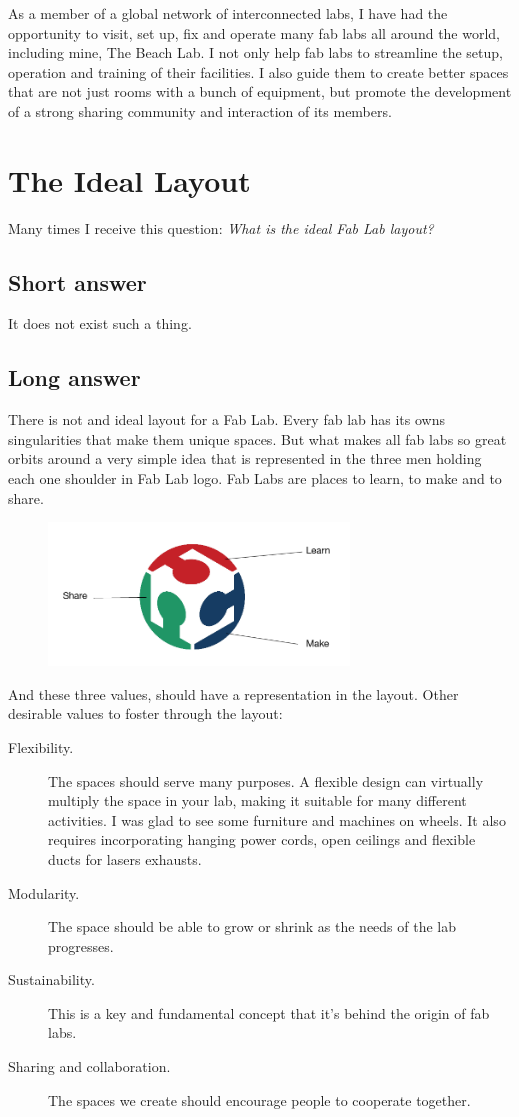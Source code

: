 \documentclass[a4paper,12pt,titlepage]{article}
\begin{document}
As a member of a global network of interconnected labs, I have had the opportunity to
visit, set up, fix and operate many fab labs all around the world, including mine, The Beach Lab. I not
only help fab labs to streamline the setup, operation and training of their facilities. I also
guide them to create better spaces that are not just rooms with a bunch of equipment, but
promote the development of a strong sharing community and interaction of its members.


\section{The Ideal Layout}
Many times I receive this question: \textit{What is the ideal Fab Lab layout?}
\subsection{Short answer} 
It does not exist such a thing.

\subsection{Long answer}
There is not and ideal layout for a Fab Lab. Every fab lab has its owns singularities that make
them unique spaces. But what makes all fab labs so great orbits around a very simple idea that
is represented in the three men holding each one shoulder in Fab Lab logo. Fab Labs are
places to learn, to make and to share. 

\begin{figure}[h] %
   \centering
   \includegraphics[width=8cm]{files/learn-make-share} 
\end{figure}

And these three values, should have a representation in the layout. Other desirable values to foster through the layout:
\begin{description}
\item[Flexibility.] The spaces should serve many purposes. A flexible design can virtually multiply
the space in your lab, making it suitable for many different activities. I was glad to see some
furniture and machines on wheels. It also requires incorporating hanging power cords, open
ceilings and flexible ducts for lasers exhausts.
\item[Modularity.] The space should be able to grow or shrink as the needs of the lab progresses.
\item[Sustainability.] This is a key and fundamental concept that it's behind the origin of fab labs.
\item[Sharing and collaboration.] The spaces we create should encourage people to cooperate
together.
\end{description}
 
\end{document}
